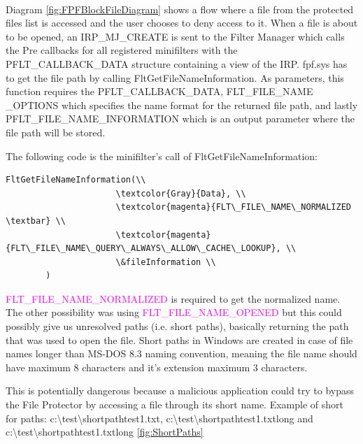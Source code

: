 		\paragraph{}
		Diagram \ref{fig:FPFBlockFileDiagram} shows a flow where a file from the protected files list is accessed and the user chooses to deny access to it. When a file is about to be opened, an IRP\_MJ\_CREATE is sent to the Filter Manager which calls the Pre callbacks for all registered minifilters with the \textcolor{Emerald} {PFLT\_CALLBACK\_DATA} structure containing a view of the IRP. fpf.sys has to get the file path by calling FltGetFileNameInformation. As parameters, this function requires the \textcolor{Emerald}{PFLT\_CALLBACK\_DATA}, \textcolor{Emerald} {FLT\_FILE\_NAME \_OPTIONS} which specifies the name format for the returned file path, and lastly \textcolor{Emerald} {PFLT\_FILE\_NAME\_INFORMATION} which is an output parameter where the file path will be stored. 
		
		\newpage
		The following code is the minifilter's call of FltGetFileNameInformation:
		
		\begin{Verbatim}[fontsize=\small, commandchars=\\\{\}]
		FltGetFileNameInformation(\\
		              \textcolor{Gray}{Data}, \\
		              \textcolor{magenta}{FLT\_FILE\_NAME\_NORMALIZED \textbar} \\
		              \textcolor{magenta}{FLT\_FILE\_NAME\_QUERY\_ALWAYS\_ALLOW\_CACHE\_LOOKUP}, \\
		              \&fileInformation \\
		)
		\end{Verbatim}
		
		\textcolor{magenta}{FLT\_FILE\_NAME\_NORMALIZED} is required to get the normalized name. The other possibility was using \textcolor{magenta}{FLT\_FILE\_NAME\_OPENED} but this could possibly give us unresolved paths (i.e. short paths), basically returning the path that was used to open the file. Short paths in Windows are created in case of file names longer than MS-DOS 8.3 naming convention, meaning the file name should have maximum 8 characters and it's extension maximum 3 characters.
		
		This is potentially dangerous because a malicious application could try to bypass the File Protector by accessing a file through its short name. Example of short for paths: c:\textbackslash test\textbackslash shortpathtest1.txt, c:\textbackslash test\textbackslash shortpathtest1.txtlong and \\ c:\textbackslash test\textbackslash shortpathtest1.txtlong \ref{fig:ShortPaths}
		
